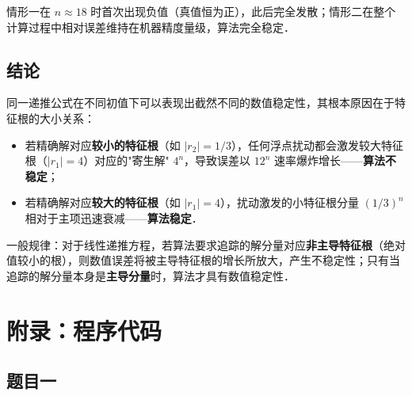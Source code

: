 \documentclass[UTF8,a4paper,11pt]{article}
\begin{document}
情形一在 $n \approx 18$ 时首次出现负值（真值恒为正），此后完全发散；情形二在整个计算过程中相对误差维持在机器精度量级，算法完全稳定．

\subsection{结论}

同一递推公式在不同初值下可以表现出截然不同的数值稳定性，其根本原因在于特征根的大小关系：
\begin{itemize}
  \item 若精确解对应\textbf{较小的特征根}（如 $|r_2|=1/3$），任何浮点扰动都会激发较大特征根（$|r_1|=4$）对应的"寄生解" $4^n$，导致误差以 $12^n$ 速率爆炸增长——\textbf{算法不稳定}；
  \item 若精确解对应\textbf{较大的特征根}（如 $|r_1|=4$），扰动激发的小特征根分量 $(1/3)^n$ 相对于主项迅速衰减——\textbf{算法稳定}．
\end{itemize}

一般规律：对于线性递推方程，若算法要求追踪的解分量对应\textbf{非主导特征根}（绝对值较小的根），则数值误差将被主导特征根的增长所放大，产生不稳定性；只有当追踪的解分量本身是\textbf{主导分量}时，算法才具有数值稳定性．

\clearpage

\section{附录：程序代码}

\subsection{题目一}
\end{document}
